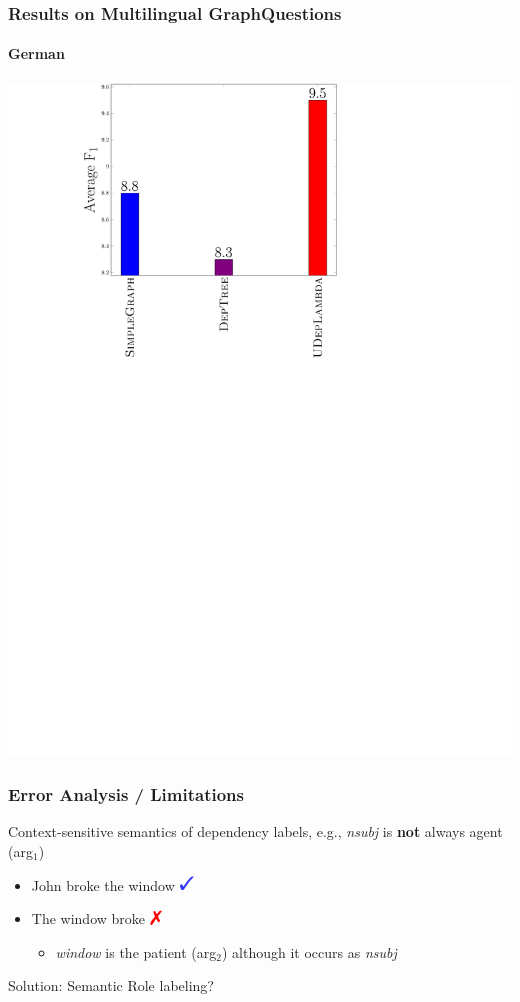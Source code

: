 \documentclass[mathserif,12pt]{beamer}
\newcommand{\cmark}{\ding{51}}%
\newcommand{\xmark}{\ding{55}}%
\newcommand{\hlight}[1]{{\color{blue!80} #1}}
\begin{document}
\begin{frame}
\frametitle{Results on Multilingual GraphQuestions}
\framesubtitle{German}
\centering
\large
\vspace{0.4em}
\includegraphics[trim=9.5em 0em 23em 0.5em,clip=true,scale=0.45]{figures/deplambda_results_plot_ud_gq-de}
\end{frame}

\begin{frame}
\frametitle{Error Analysis / Limitations}
\large
Context-sensitive semantics of dependency labels, e.g., \textit{nsubj} is \textbf{not} always agent (arg$_1$)
\begin{itemize}
\item John broke the window $\Large \textbf{\hlight{\cmark}}$
\vspace{1em}
\item The {\color{red} window} broke $\Large \textbf{\color{red} {\xmark}}$
\begin{itemize}
\item \large \textsl{window} is the patient (arg$_2$) although it occurs as \textsl{nsubj}
\end{itemize}
\end{itemize}

\vspace{2em}
\hlight{Solution:} Semantic Role labeling? 
\end{frame}
\end{document}
